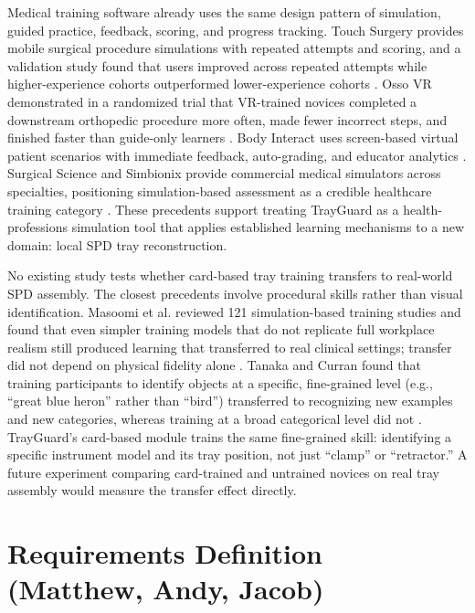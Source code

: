 \documentclass[10pt,a4paper]{article}
\begin{document}
Medical training software already uses the same design pattern of simulation, guided practice, feedback, scoring, and progress tracking. Touch Surgery provides mobile surgical procedure simulations with repeated attempts and scoring, and a validation study found that users improved across repeated attempts while higher-experience cohorts outperformed lower-experience cohorts \cite{tulipan-et-al-2019}. Osso VR demonstrated in a randomized trial that VR-trained novices completed a downstream orthopedic procedure more often, made fewer incorrect steps, and finished faster than guide-only learners \cite{orland-et-al-2020}. Body Interact uses screen-based virtual patient scenarios with immediate feedback, auto-grading, and educator analytics \cite{wolters-kluwer-body-interact-accessed-2026}. Surgical Science and Simbionix provide commercial medical simulators across specialties, positioning simulation-based assessment as a credible healthcare training category \cite{surgical-science-simulators-accessed-2026}. These precedents support treating TrayGuard as a health-professions simulation tool that applies established learning mechanisms to a new domain: local SPD tray reconstruction.

No existing study tests whether card-based tray training transfers to real-world SPD assembly. The closest precedents involve procedural skills rather than visual identification. Masoomi et al. reviewed 121 simulation-based training studies and found that even simpler training models that do not replicate full workplace realism still produced learning that transferred to real clinical settings; transfer did not depend on physical fidelity alone \cite{masoomi-et-al-2021}. Tanaka and Curran found that training participants to identify objects at a specific, fine-grained level (e.g., ``great blue heron'' rather than ``bird'') transferred to recognizing new examples and new categories, whereas training at a broad categorical level did not \cite{tanaka-and-curran-2005}. TrayGuard's card-based module trains the same fine-grained skill: identifying a specific instrument model and its tray position, not just ``clamp'' or ``retractor.'' A future experiment comparing card-trained and untrained novices on real tray assembly would measure the transfer effect directly.



\section{Requirements Definition \hfill {\normalfont\small (Matthew, Andy, Jacob)}}
\label{sec:requirements-definition}
\end{document}
